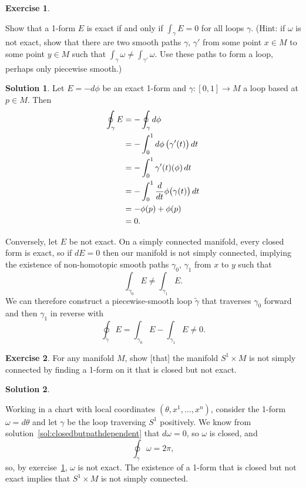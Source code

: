 \documentclass[11pt, a4paper]{report}
\theoremstyle{definition}
\newtheorem{exercise}{Exercise}[part]
\newtheorem{solution}{Solution}[part]
\newenvironment{ex}{\begin{exercise}}{\end{exercise}\pagebreak[1]}
\newenvironment{sol}{\begin{solution}}{\end{solution}\pagebreak[3]}
\renewcommand*{\d}{\ensuremath\mathop{}\mathopen{}d}
\begin{document}
\begin{ex}\label{ex:exactifintegraloverloopiszero}

Show that a 1-form $E$ is exact if and only if $\int_\gamma E = 0$ for all loops $\gamma$. (Hint: if $\omega$ is not exact, show that there are two smooth paths $\gamma$, $\gamma'$ from some point $x \in M$ to some point $y \in M$ such that $\int_\gamma \omega \neq \int_{\gamma'} \omega$. Use these paths to form a loop, perhaps only piecewise smooth.)

\end{ex}

\begin{sol}

Let $E = -d\phi$ be an exact 1-form and $\gamma: [0, 1] \to M$ a loop based at $p \in M$. Then
\begin{align*}
    \oint_\gamma E &= - \oint_\gamma d\phi \\
                   &= - \int_0^1 d\phi \, \bigl( \gamma'(t) \bigr) \d t \\
                   &= - \int_0^1 \gamma'(t)(\phi) \d t \\
                   &= - \int_0^1 \frac{d}{dt} \phi \bigl( \gamma(t) \bigr) \d t \\
                   &= - \phi(p) + \phi(p) \\
                   &= 0.
\end{align*}

Conversely, let $E$ be not exact. On a simply connected manifold, every closed form is exact, so if $dE = 0$ then our manifold is not simply connected, implying the existence of non-homotopic smooth paths $\gamma_0$, $\gamma_1$ from $x$ to $y$ such that
\[
    \int_{\gamma_0} E \neq \int_{\gamma_1} E.
\]
We can therefore construct a piecewise-smooth loop $\tilde{\gamma}$ that traverses $\gamma_0$ forward and then $\gamma_1$ in reverse with
\[
    \oint_{\tilde{\gamma}} E = \int_{\gamma_0} E - \int_{\gamma_1} E \neq 0.
\]

\end{sol}

\begin{ex}

For any manifold $M$, show [that] the manifold $S^1 \times M$ is not simply connected by finding a 1-form on it that is closed but not exact.

\end{ex}

\begin{sol}\label{sol:s1productnotsimplyconnected}

Working in a chart with local coordinates $(\theta, x^1, \ldots, x^n)$, consider the 1-form $\omega = d\theta$ and let $\gamma$ be the loop traversing $S^1$ positively.
We know from solution~\ref{sol:closedbutpathdependent} that $d \omega = 0$, so $\omega$ is closed, and
\[
    \oint_\gamma \omega = 2 \pi,
\]
so, by exercise~\ref{ex:exactifintegraloverloopiszero}, $\omega$ is not exact.
The existence of a 1-form that is closed but not exact implies that $S^1 \times M$ is not simply connected.

\end{sol}
\end{document}
